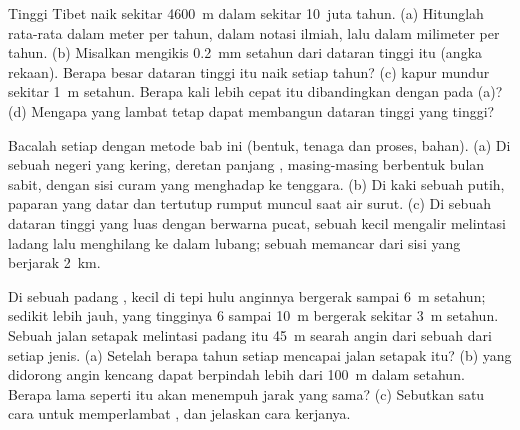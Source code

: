 \begin{exercise}[$\star\star$]\label{exo:g9:landforms:10}
 Tinggi Tibet naik sekitar \qty{4600}{m} dalam sekitar 10~juta
tahun. (a) Hitunglah rata-rata  dalam meter per tahun,
dalam notasi ilmiah, lalu dalam milimeter per tahun. (b) Misalkan 
mengikis \qty{0.2}{mm} setahun dari dataran tinggi itu (angka rekaan).
Berapa besar dataran tinggi itu naik setiap tahun? (c)  kapur mundur
sekitar \qty{1}{m} setahun. Berapa kali lebih cepat itu dibandingkan
dengan  pada (a)? (d) Mengapa  yang lambat tetap
dapat membangun dataran tinggi yang tinggi?
\end{exercise}

\begin{exercise}[$\star\star\star$]\label{exo:g9:landforms:11}
Bacalah setiap  dengan metode bab ini (bentuk, tenaga dan
proses, bahan). (a) Di sebuah negeri yang kering, deretan panjang 
, masing-masing berbentuk bulan sabit, dengan sisi curam yang
menghadap ke tenggara. (b) Di kaki sebuah  putih, paparan 
yang datar dan tertutup rumput  muncul saat air surut. (c) Di sebuah
dataran tinggi yang luas dengan  berwarna pucat, sebuah 
kecil mengalir melintasi ladang lalu menghilang ke dalam lubang; sebuah
 memancar dari sisi  yang berjarak \qty{2}{km}.
\end{exercise}

\begin{exercise}[$\star\star\star$]\label{exo:g9:landforms:12}
Di sebuah padang ,  kecil di tepi hulu anginnya
bergerak sampai \qty{6}{m} setahun; sedikit lebih jauh,  yang
tingginya 6 sampai \qty{10}{m} bergerak sekitar \qty{3}{m} setahun. Sebuah
jalan setapak melintasi padang itu \qty{45}{m} searah angin dari sebuah
 dari setiap jenis. (a) Setelah berapa tahun setiap  mencapai
jalan setapak itu? (b)  yang didorong angin kencang dapat
berpindah lebih dari \qty{100}{m} dalam setahun. Berapa lama  seperti
itu akan menempuh jarak yang sama? (c) Sebutkan satu cara untuk
memperlambat , dan jelaskan cara kerjanya.
\end{exercise}

